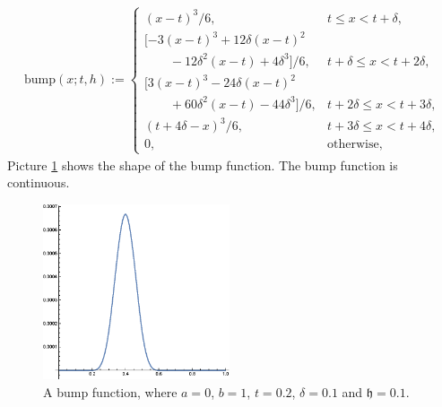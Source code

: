 \documentclass{iitthesis}
\theoremstyle{definition}
\theoremstyle{remark}
\begin{document}
\begin{align} \label{bumpfunction}
\text{bump}(x;t,h):= \begin{cases} \displaystyle (x-t)^3/6,  &t \le x < t+\delta,\\[1ex]
\displaystyle [-3(x-t)^3+12\delta(x-t)^2\\[1ex] \displaystyle\qquad -12\delta^2(x-t)+4\delta^3]/6,  &t+\delta \le x < t+2\delta,\\[1ex]
\displaystyle [3(x-t)^3-24\delta(x-t)^2\\[1ex]  \displaystyle\qquad +60\delta^2(x-t)-44\delta^3]/6, &t+2\delta \le x < t+3\delta,\\[1ex]
\displaystyle (t+4\delta-x)^3/6,  &t+3\delta \le x < t+4\delta,\\[1ex]
\displaystyle  0,  &\text{otherwise},
\end{cases}
\end{align}
Picture \ref{fig:bumpfunction} shows the shape of the bump function. The bump function is continuous.
\begin{figure}[h]
\centering
\includegraphics[width=5.5cm]{bump.eps}
\caption{A bump function, where $a=0$, $b=1$, $t=0.2$, $\delta=0.1$ and $\mathfrak{h}=0.1$. \label{fig:bumpfunction}}
\end{figure}
\end{document}
